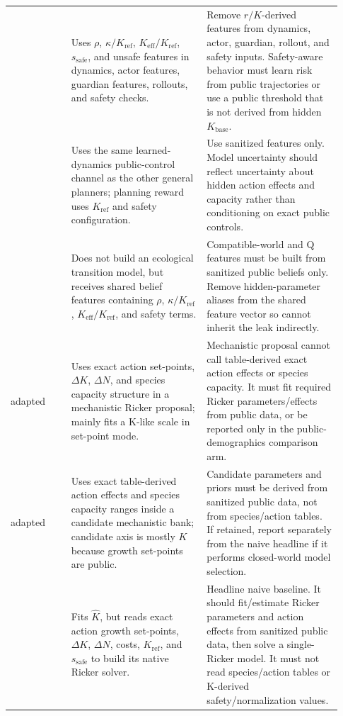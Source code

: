 \documentclass[11pt]{article}
\newcommand{\code}[1]{\texttt{\detokenize{#1}}}
\newcommand{\rhoctl}{\rho}
\newcommand{\kappactl}{\kappa}
\newcommand{\Kbase}{K_{\mathrm{base}}}
\newcommand{\Keff}{K_{\mathrm{eff}}}
\newcommand{\Kref}{K_{\mathrm{ref}}}
\newcommand{\ssafe}{s_{\mathrm{safe}}}
\begin{document}
\begin{longtable}{p{0.17\linewidth}p{0.38\linewidth}p{0.38\linewidth}}
\code{ogsrl} &
Uses \(\rhoctl\), \(\kappactl/\Kref\), \(\Keff/\Kref\), \(\ssafe\), and unsafe
features in dynamics, actor features, guardian features, rollouts, and safety
checks. &
Remove \(r/K\)-derived features from dynamics, actor, guardian, rollout, and
safety inputs. Safety-aware behavior must learn risk from public trajectories or
use a public threshold that is not derived from hidden \(\Kbase\). \\

\code{mopo} &
Uses the same learned-dynamics public-control channel as the other general
planners; planning reward uses \(\Kref\) and safety configuration. &
Use sanitized features only. Model uncertainty should reflect uncertainty about
hidden action effects and capacity rather than conditioning on exact public
controls. \\

\code{delphic} &
Does not build an ecological transition model, but receives shared belief
features containing \(\rhoctl\), \(\kappactl/\Kref\), \(\Keff/\Kref\), and
safety terms. &
Compatible-world and Q features must be built from sanitized public beliefs
only. Remove hidden-parameter aliases from the shared feature vector so
\code{delphic} cannot inherit the leak indirectly. \\

adapted \code{moor} &
Uses exact action set-points, \(\Delta K\), \(\Delta N\), and species capacity
structure in a mechanistic Ricker proposal; mainly fits a K-like scale in
set-point mode. &
Mechanistic proposal cannot call table-derived exact action effects or species
capacity. It must fit required Ricker parameters/effects from public data, or be
reported only in the public-demographics comparison arm. \\

adapted \code{plus} &
Uses exact table-derived action effects and species capacity ranges inside a
candidate mechanistic bank; candidate axis is mostly \(K\) because growth
set-points are public. &
Candidate parameters and priors must be derived from sanitized public data, not
from species/action tables. If retained, report separately from the naive
headline if it performs closed-world model selection. \\

\code{moor_native} &
Fits \(\hat K\), but reads exact action growth set-points, \(\Delta K\),
\(\Delta N\), costs, \(\Kref\), and \(\ssafe\) to build its native Ricker solver. &
Headline naive baseline. It should fit/estimate Ricker parameters and action
effects from sanitized public data, then solve a single-Ricker model. It must not
read species/action tables or K-derived safety/normalization values. \\


\end{longtable}
\end{document}
